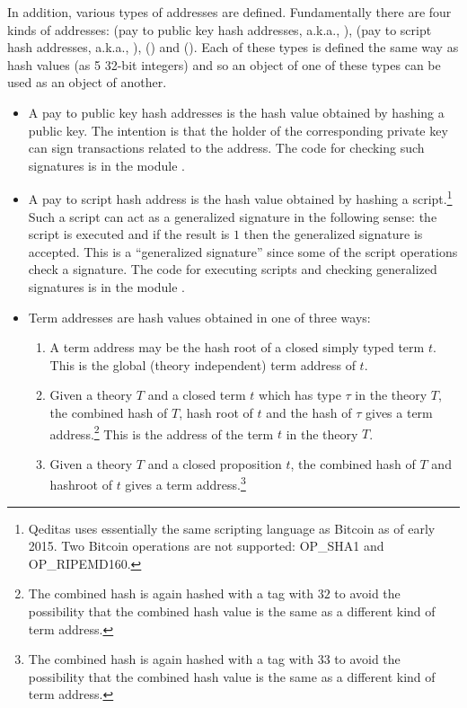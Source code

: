 In addition, various types of addresses are defined.
Fundamentally there are four kinds of addresses:
{} (pay to public key hash addresses, a.k.a., {}),
{} (pay to script hash addresses, a.k.a., {}),
{} ({}) and {} ({}).
Each of these types is defined the same way as hash values (as 5 32-bit integers)
and so an object of one of these types can be used as an object of another.
\begin{itemize}
\item {} A pay to public key hash addresses is the hash value
obtained by hashing a public key. The intention is that the holder of the corresponding private key
can sign transactions related to the address.
The code for checking such signatures is in the module {}.
\item {} A pay to script hash address is the hash value
obtained by hashing a script.\footnote{Qeditas uses essentially the same scripting language as Bitcoin as of early 2015. Two Bitcoin operations are not supported: OP\_SHA1 and OP\_RIPEMD160.}
Such a script can act as a generalized signature in the following sense:
the script is executed and if the result is $1$ then the generalized signature is accepted.
This is a ``generalized signature'' since some of the script operations check a signature.
The code for executing scripts and checking generalized signatures is in the module {}.
\item {}
Term addresses are hash values obtained in one of three ways:
\begin{enumerate}
\item A term address may be the hash root of a closed simply typed term $t$.
This is the global (theory independent) term address of $t$.
\item Given a theory $T$ and a closed term $t$ which has type $\tau$ in the theory $T$,
the combined hash of $T$, hash root of $t$ and the hash of $\tau$
gives a term address.\footnote{The combined hash is again hashed with a tag with $32$ to avoid the possibility that the combined hash value is the same as a different kind of term address.}
This is the address of the term $t$ in the theory $T$.
\item Given a theory $T$ and a closed proposition $t$,
the combined hash of $T$ and hashroot of $t$
gives a term address.\footnote{The combined hash is again hashed with a tag with $33$ to avoid the possibility that the combined hash value is the same as a different kind of term address.}

\end{enumerate}
\end{itemize}
